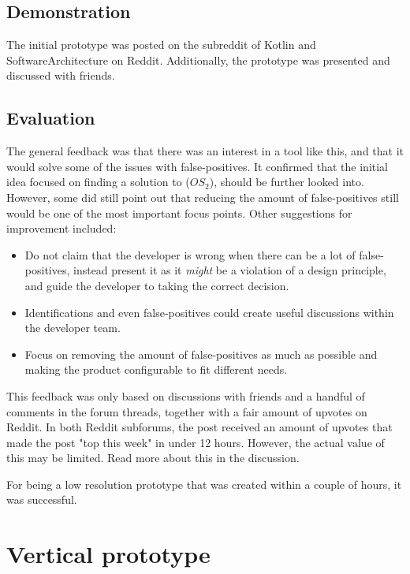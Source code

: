 \documentclass[pdftex,10pt,b5paper,twoside]{report}
\begin{document}
\subsection*{Demonstration}
The initial prototype was posted on the subreddit of Kotlin\cite{kotlin-reddit} and SoftwareArchitecture\cite{softwarearch-reddit} on Reddit. Additionally, the prototype was presented and discussed with friends. 

\subsection*{Evaluation}

The general feedback was that there was an interest in a tool like this, and that it would solve some of the issues with false-positives. It confirmed that the initial idea focused on finding a solution to (\(OS_{2}\)), should be further looked into. However, some did still point out that reducing the amount of false-positives still would be one of the most important focus points. Other suggestions for improvement included: 
\begin{itemize}
    \item Do not claim that the developer is wrong when there can be a lot of false-positives, instead present it as it \textit{might} be a violation of a design principle, and guide the developer to taking the correct decision.
    \item Identifications and even false-positives could create useful discussions within the developer team.
    \item Focus on removing the amount of false-positives as much as possible and making the product configurable to fit different needs.
  
\end{itemize}

This feedback was only based on discussions with friends and a handful of comments in the forum threads, together with a fair amount of upvotes on Reddit. In both Reddit subforums, the post received an amount of upvotes that made the post "top this week" in under 12 hours. However, the actual value of this may be limited. Read more about this in the discussion. 

For being a low resolution prototype that was created within a couple of hours, it was successful.

\section{Vertical prototype}
\label{vertical-prototype}
\end{document}
